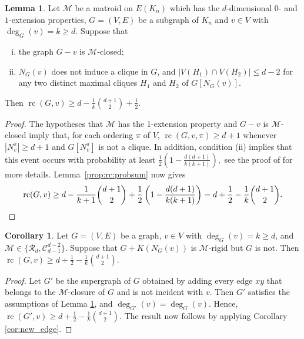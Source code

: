\documentclass[11pt,a4paper]{article}
\theoremstyle{definition}
\newtheorem{lemma}[theorem]{Lemma}
\newtheorem{corollary}[theorem]{Corollary}
\DeclareMathOperator{\rc}{rc}
\newcommand{\cR}{\mathcal{R}}
\newcommand{\cM}{\mathcal{M}}
\newcommand{\cC}{\mathcal{C}}
\begin{document}
\begin{lemma}
\label{lem:uglyboundnew}
Let $\cM$ be a matroid on $E(K_n)$ which has the $d$-dimensional $0$- and $1$-extension properties, $ G=(V,E)$ be a subgraph of $K_n$ and $v\in V$ with $\deg_G(v)=k\geq {d}$.
Suppose that 
\begin{enumerate}[(i)] 
\item the graph $G-v$ is $\cM$-closed; 
\item $N_G(v)$ does not induce a clique in $G$, and $|V(H_1) \cap V(H_2)| \leq d - 2$  for any two distinct 
maximal cliques $H_1$ and $H_2$ of $G[N_G(v)]$.
\end{enumerate}
Then $\rc(G,v)\geq d-\frac{1}{k}{\binom{d+1}{2}}+\frac{1}{2}$.
\end{lemma}
\begin{proof}
The hypotheses that $\mathcal{M}$ has the 1-extension property and $G-v$ is $\cM$-closed imply that, for each ordering $\pi$ of $V$, $\rc(G,v,\pi)\geq d+1$ whenever $|N_v^\pi|\geq d+1$ and $G[N_v^\pi]$ is not a clique. In addition, condition (ii) 
implies that this event occurs with probability at least $ \frac{1}{2}\left(1-\frac{d(d+1)}{k(k+1)}\right),$ see the proof of \cite[Lemma 3.2]{vill} for more details.
Lemma~\ref{prop:rc:probsum} now gives
\begin{equation*}
\rc(G,v)
\geq  d-\frac{1}{k+1}{\binom{d+1}{2}}+\frac{1}{2}\left(1-\frac{d(d+1)}{k(k+1)}\right)
=d+\frac{1}{2}-\frac{1}{k}{\binom{d+1}{2}}.
\qedhere	
\end{equation*}
\end{proof}





\begin{corollary}\label{coro:rc:geq:d}
Let $ G=(V, E)$ be a graph, $v\in V$ with $\deg_G(v)=k\geq d$, and
		$\cM\in\{\cR_d,\cC_{d-1}^{d-2}\}$.
        Suppose that $G+K(N_G(v))$ is $\mathcal{M}$-rigid but $G$ is not.
		Then $\rc(G,v)\geq d+\frac{1}{2}-\frac{1}{k}{\binom{d+1}{2}}.$
\end{corollary}
	\begin{proof}
	Let $G'$ be the supergraph of $G$ obtained by adding every edge $xy$ that belongs to the $\mathcal{M}$-closure of $G$ and is not incident with $v$.
    Then $G'$ satisfies the assumptions of Lemma \ref{lem:uglyboundnew}, and $\deg_{G'}(v)=\deg_G(v)$. Hence,
    $\rc(G',v)\geq d+\frac{1}{2}-\frac{1}{k}{\binom{d+1}{2}}$.
    The result now follows by applying 
    Corollary \ref{cor:new_edge}.
	\end{proof}
\end{document}
